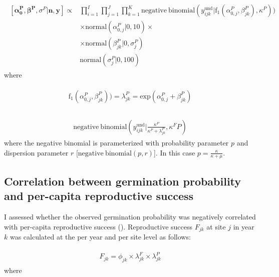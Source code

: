 \documentclass[12pt, oneside, titlepage]{article}   	%
\begin{document}
\begin{align}
  \begin{split}
 [ \bm{\alpha^P_0}, \bm{\beta^P}, \sigma^P | \bm{n}, \bm{y} ] \propto 
 & \prod_{i=1}^{I} \prod_{j=1}^{J} \prod_{k=1}^{K}  \mathrm{negative \ binomial} ( y^{\mathrm{und}}_{ijk} | \mathrm{f}_1(\alpha^P_{0,j} , \beta^P_{jk} ), \kappa^P ) )
     \\ & \times \mathrm{normal} ( \alpha^P_{0,j} | 0, 10)  \times 
     \\ & \times \mathrm{normal} ( \beta^P_{jk} | 0, \sigma^P_j) 
    \\ & \mathrm{normal} ( \sigma^P_j | 0, 100)  
   \end{split}
\end{align}
%
where

\begin{align}
  \begin{split}
\mathrm{f}_1(\alpha^P_{0,j} , \beta^P_{jk} ) ) = \lambda^P_{jk} = \mathrm{exp}( \alpha^P_{0,j} + \beta^P_{jk} ) \\
  \end{split}
\end{align}

\begin{align}
  \begin{split}
  \mathrm{negative \ binomial} ( y^{\mathrm{und}}_{ijk} | \frac{\kappa^P}{\kappa^P + \lambda^P_{jk}} ,  \kappa^FP)
  \end{split}
\end{align}
%
where the negative binomial is parameterized with probability parameter $p$ and dispersion parameter $r$ [$ \mathrm{negative \ binomial}(p,r)$]. In this case $p=\frac{\kappa}{\kappa+\mu}$.

\subsection*{Correlation between germination probability and per-capita reproductive success}

I assessed whether the observed germination probability was negatively correlated with per-capita reproductive success (\cite{venable2007}). Reproductive success $F_{jk}$ at site $j$ in year $k$ was calculated at the per year and per site level as follows:

\begin{align}
  \begin{split}
F_{jk} = \phi_{jk} \times \lambda^F_{jk} \times \lambda^P_{jk}
  \end{split}
\end{align}
%
where
\end{document}
